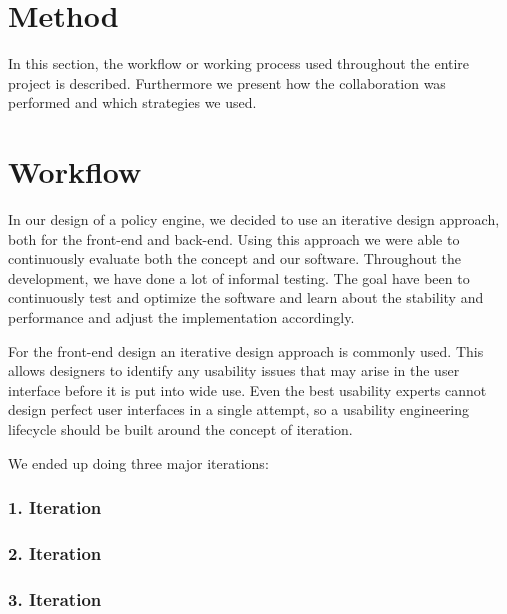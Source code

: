 \section{Method} \label{sec:method}
In this section, the workflow or working process used throughout the entire project is described. Furthermore we present how the collaboration was performed and which strategies we used.

\section{Workflow} \label{sec:workflow}
In our design of a policy engine, we decided to use an iterative design approach, both for the front-end and back-end. Using this approach we were able to continuously evaluate both the concept and our software. Throughout the development, we have done a lot of informal testing. The goal have been to continuously test and optimize the software and learn about the stability and performance and adjust the implementation accordingly. 

For the front-end design an iterative design approach is commonly used. This allows designers to identify any usability issues that may arise in the user interface before it is put into wide use. Even the best usability experts cannot design perfect user interfaces in a single attempt, so a usability engineering lifecycle should be built around the concept of iteration. \cite{Nielsen1993}

We ended up doing three major iterations:

\subsubsection{1. Iteration}



\subsubsection{2. Iteration}



\subsubsection{3. Iteration}




